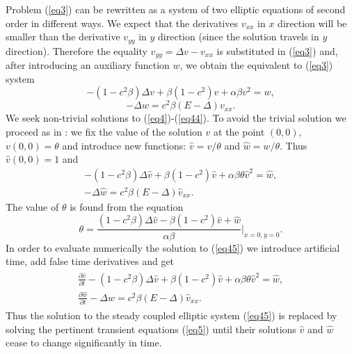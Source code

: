 \documentclass[preprint]{elsarticle}
\newcommand{\rf}[1]{(\ref{#1})}
\begin{document}
Problem \rf{eq3} can be rewritten  as a  system of two elliptic equations of second order in different ways. We expect that  the derivatives $v_{xx}$ in $x $ direction  will be smaller than the derivative $v_{yy}$ in $y$ direction (since the solution travels in $y$ direction). Therefore the equality $v_{yy} = \Delta v- v_{xx}$ is substituted in \rf{eq3} and, after  introducing an auxiliary  function $w$, we obtain the equivalent to \rf{eq3} system
\begin{equation}\label{eq4}
- (1-c^2 \beta) \Delta v + \beta (1-c^2) v + \alpha \beta v^2 = w, 
\end{equation}
\begin{equation}\label{eq44}
 - \Delta w =  c^2 \beta (E- \Delta) v_{xx}. 
\end{equation}
We  seek  non-trivial solutions to \rf{eq4}-\rf{eq44}. To avoid the trivial solution we proceed as in \cite{Ch2012}: we fix the value of the solution $v$ at the point $(0,0)$,    $v(0,0)=\theta $ and introduce  new  functions: $\widehat{v}=v/{\theta} $ and $\widehat{w}=w/{\theta} $. Thus  
$ \widehat{v}(0,0)=1$ and 
\begin{equation}\label{eq45}
\begin{split}
 - (1-c^2 \beta) \Delta \widehat{v} + \beta (1-c^2) \widehat{v} + \alpha \beta \theta \widehat{v}^2 = \widehat{w}, \\
 - \Delta \widehat{w} =  c^2 \beta (E- \Delta) \widehat{v}_{xx}.\;\;\;\; \;\;\;\;  \;\;\;\;  \;\;\;\; 
\end{split}
\end{equation}
The value of $\theta $ is found from the  equation 
\begin{equation}\label{eqtheta}
\theta = \frac{ (1-c^2 \beta) \Delta \widehat{v} - \beta (1-c^2) \widehat{v} +\widehat{w}}{\alpha \beta} |_{x=0,y=0} .
\end{equation}
In order to evaluate numerically the solution to \rf{eq45} we introduce artificial time, add false  time derivatives and  get
\begin{align}\label{eq5}
\begin{split}
 \frac {\partial \widehat{v}}{\partial t} - (1-c^2 \beta) \Delta \widehat{v} + \beta (1-c^2) \widehat{v} + \alpha \beta \theta \widehat{v}^2 = \widehat{w}, \\
 \frac {\partial \widehat{w}}{\partial t} - \Delta \widehat{w} =  c^2 \beta (E- \Delta) \widehat{v}_{xx}. \;\;\;\;  \;\;\;\;  \;\;\;\;  \;\;\;\;
\end{split}
\end{align}
Thus the solution to the steady coupled elliptic system \rf{eq45} is replaced by   solving the  pertinent transient equations \rf{eq5} until their solutions $\widehat{v}$ and $\widehat{w}$ cease to change significantly in time. 
\end{document}
